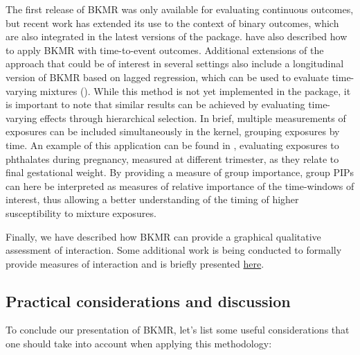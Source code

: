 \documentclass[
]{book}
\begin{document}
The first release of BKMR was only available for evaluating continuous outcomes, but recent work has extended its use to the context of binary outcomes, which are also integrated in the latest versions of the package. \citet{domingo2019association} have also described how to apply BKMR with time-to-event outcomes. Additional extensions of the approach that could be of interest in several settings also include a longitudinal version of BKMR based on lagged regression, which can be used to evaluate time-varying mixtures (\citet{liu2018lagged}). While this method is not yet implemented in the package, it is important to note that similar results can be achieved by evaluating time-varying effects through hierarchical selection. In brief, multiple measurements of exposures can be included simultaneously in the kernel, grouping exposures by time. An example of this application can be found in \citet{tyagi2021identifying}, evaluating exposures to phthalates during pregnancy, measured at different trimester, as they relate to final gestational weight. By providing a measure of group importance, group PIPs can here be interpreted as measures of relative importance of the time-windows of interest, thus allowing a better understanding of the timing of higher susceptibility to mixture exposures.

Finally, we have described how BKMR can provide a graphical qualitative assessment of interaction. Some additional work is being conducted to formally provide measures of interaction and is briefly presented \href{https://github.com/jantonelli111/NLinteraction}{here}.

\hypertarget{practical-considerations-and-discussion}{%
\subsection{Practical considerations and discussion}\label{practical-considerations-and-discussion}}

To conclude our presentation of BKMR, let's list some useful considerations that one should take into account when applying this methodology:
\end{document}
